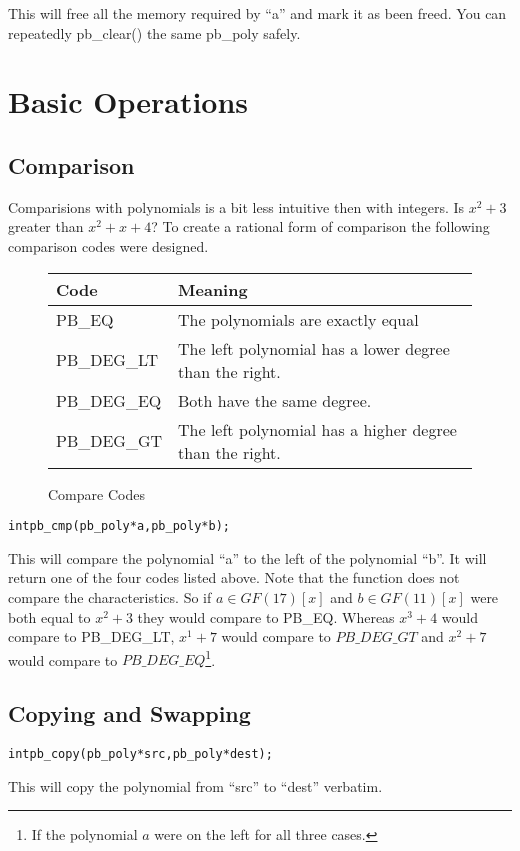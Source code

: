\documentclass[b5paper]{book}
\begin{document}
This will free all the memory required by ``a'' and mark it as been freed.  You can repeatedly pb\_clear() the same
pb\_poly safely.

\chapter{Basic Operations}
\section{Comparison}
Comparisions with polynomials is a bit less intuitive then with integers.  Is $x^2 + 3$ greater than $x^2 + x + 4$?  To
create a rational form of comparison the following comparison codes were designed.

\begin{figure}[here]
\begin{small}
\begin{center}
\begin{tabular}{|l|l|}
\hline \textbf{Code} & \textbf{Meaning} \\
\hline PB\_EQ & The polynomials are exactly equal \\
\hline PB\_DEG\_LT & The left polynomial has a lower degree than the right. \\
\hline PB\_DEG\_EQ & Both have the same degree. \\
\hline PB\_DEG\_GT & The left polynomial has a higher degree than the right. \\
\hline
\end{tabular}
\end{center}
\end{small}
\caption{Compare Codes}
\end{figure}

\begin{alltt}
int pb_cmp(pb_poly *a, pb_poly *b);
\end{alltt}

This will compare the polynomial ``a'' to the left of the polynomial ``b''.  It will return one of the four
codes listed above.  Note that the function does not compare the characteristics.  So if $a \in GF(17)[x]$ and 
$b \in GF(11)[x]$ were both equal to $x^2 + 3$ they would compare to PB\_EQ.  Whereas $x^3 + 4$
would compare to PB\_DEG\_LT, $x^1 + 7$ would compare to $PB\_DEG\_GT$ and $x^2 + 7$ would compare to $PB\_DEG\_EQ$\footnote{If the polynomial $a$ were on the left for all three cases.}.

\section{Copying and Swapping}
\begin{alltt}
int pb_copy(pb_poly *src, pb_poly *dest);
\end{alltt}
This will copy the polynomial from ``src'' to ``dest'' verbatim.
\end{document}
